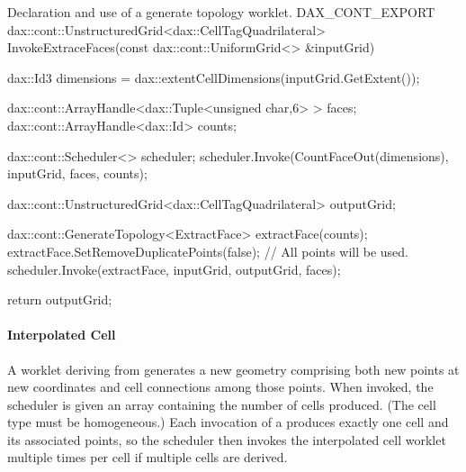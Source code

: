 \begin{daxexample}{Declaration and use of a generate topology worklet.}
DAX_CONT_EXPORT
dax::cont::UnstructuredGrid<dax::CellTagQuadrilateral>
InvokeExtraceFaces(const dax::cont::UniformGrid<> &inputGrid)
{
  dax::Id3 dimensions = dax::extentCellDimensions(inputGrid.GetExtent());

  dax::cont::ArrayHandle<dax::Tuple<unsigned char,6> > faces;
  dax::cont::ArrayHandle<dax::Id> counts;

  dax::cont::Scheduler<> scheduler;
  scheduler.Invoke(CountFaceOut(dimensions), inputGrid, faces, counts);

  dax::cont::UnstructuredGrid<dax::CellTagQuadrilateral> outputGrid;

  dax::cont::GenerateTopology<ExtractFace> extractFace(counts);
  extractFace.SetRemoveDuplicatePoints(false); // All points will be used.
  scheduler.Invoke(extractFace, inputGrid, outputGrid, faces);

  return outputGrid;
}
\end{daxexample}


\paragraph{Interpolated Cell}


A worklet deriving from  generates a new
geometry comprising both new points at new coordinates and cell connections
among those points. When invoked, the scheduler is given an array
containing the number of cells produced. (The cell type must be
homogeneous.) Each invocation of a 
produces exactly one cell and its associated points, so the scheduler then
invokes the interpolated cell worklet multiple times per cell if multiple
cells are derived.

